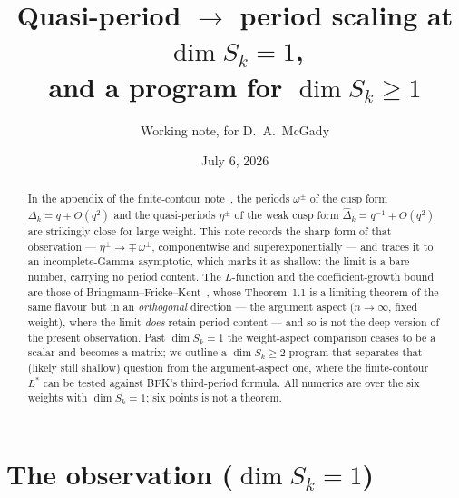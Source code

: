\documentclass[11pt]{article}
\title{Quasi-period $\to$ period scaling at $\dim S_k=1$,\\
and a program for $\dim S_k\ge1$}
\author{Working note, for D.~A.~McGady}
\date{July 6, 2026}
\newcommand{\Dhat}{\widehat\Delta}
\begin{document}
\maketitle

\begin{abstract}
\noindent
In the appendix of the finite-contour note~\cite{FCC}, the periods $\omega^\pm$ of the
cusp form $\Delta_k=q+O(q^2)$ and the quasi-periods $\eta^\pm$ of the weak cusp form
$\Dhat_k=q^{-1}+O(q^2)$ are strikingly close for large weight. This note records the sharp
form of that observation --- $\eta^\pm\to\mp\,\omega^\pm$, componentwise and
superexponentially --- and traces it to an incomplete-Gamma asymptotic, which marks it as
shallow: the limit is a bare number, carrying no period content. The $L$-function and the
coefficient-growth bound are those of Bringmann--Fricke--Kent~\cite{BFK2011}, whose
Theorem~1.1 is a limiting theorem of the same flavour but in an \emph{orthogonal}
direction --- the argument aspect ($n\to\infty$, fixed weight), where the limit \emph{does}
retain period content --- and so is not the deep version of the present observation. Past
$\dim S_k=1$ the weight-aspect comparison ceases to be a scalar and becomes a matrix; we
outline a $\dim S_k\ge2$ program that separates that (likely still shallow) question from
the argument-aspect one, where the finite-contour $L^*$ can be tested against BFK's
third-period formula. All numerics are over the six weights with $\dim S_k=1$; six points is
not a theorem.
\end{abstract}

\section{The observation ($\dim S_k=1$)}\label{sec:obs}
\end{document}

